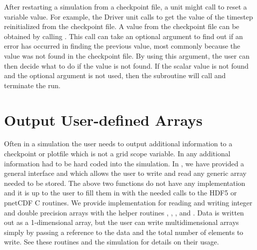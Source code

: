 After restarting a simulation from a checkpoint file, a unit might
call  to reset a variable value.  For example,
the \unit{Driver} unit calls 
to get the value of the timestep  reinitialized from the
checkpoint file.  A value from the checkpoint file can be obtained by calling
.  This call can take an optional argument to find out if an
error has occurred in finding the previous value, most commonly because the value
was not found in the checkpoint file.  By using this argument, the user can then
decide what to do if the value is not found.  If the scalar value is not found 
and the optional argument is not used, then the subroutine will call  and terminate the run.



\section{Output User-defined Arrays}
\label{Sec: Output user defined arrays}

Often in a simulation the user needs to output additional information to a checkpoint or plotfile
which is not a grid scope variable.  In \flashx any additional information had to be hard coded
into the simulation.  In \flashx, we have provided a general interface 
and  which allows the user to write and read any generic array needed to
be stored.  The above two functions do not have any implementation and it is up to the user to
fill them in with the needed calls to the HDF5 or pnetCDF C routines.  We provide implementation
for reading and writing integer and double precision arrays with the helper routines
, , , and
.  Data is written
out as a 1-dimensional array, but the user can write multidimensional arrays simply by passing a
reference to the data and the total number of elements to write. See these
routines and the simulation  for details on their usage.


